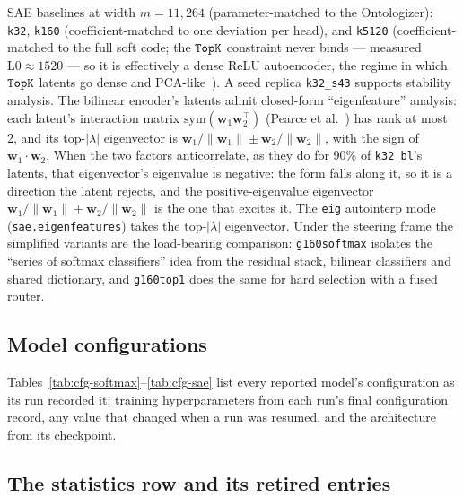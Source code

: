 SAE baselines at width $m{=}11{,}264$ (parameter-matched to the Ontologizer):
\texttt{k32}, \texttt{k160} (coefficient-matched to one deviation per
head), and \texttt{k5120} (coefficient-matched to the full soft code; the
$\mathop{\mathtt{TopK}}\limits$ constraint never binds --- measured $\mathrm{L0} \approx 1520$ --- so it is
effectively a dense ReLU autoencoder, the regime in which $\mathop{\mathtt{TopK}}\limits$ latents go
dense and PCA-like~\cite{gao2024}). A seed replica \texttt{k32\_s43}
supports stability analysis. The bilinear encoder's latents admit
closed-form ``eigenfeature'' analysis: each latent's interaction matrix
$\mathrm{sym}(\mathbf{w}_1 \mathbf{w}_2^\top)$ (Pearce
et al.~\cite{pearce2025}) has rank at most 2, and its top-$|\lambda|$
eigenvector is $\mathbf{w}_1/\lVert\mathbf{w}_1\rVert \pm
\mathbf{w}_2/\lVert\mathbf{w}_2\rVert$, with the sign of
$\mathbf{w}_1\cdot\mathbf{w}_2$. When the two factors anticorrelate, as
they do for 90\% of \texttt{k32\_bl}'s latents, that eigenvector's
eigenvalue is negative: the form falls along it, so it is a direction the
latent rejects, and the positive-eigenvalue eigenvector
$\mathbf{w}_1/\lVert\mathbf{w}_1\rVert + \mathbf{w}_2/\lVert\mathbf{w}_2\rVert$
is the one that excites it. The \texttt{eig} autointerp mode
(\texttt{sae.eigenfeatures}) takes the top-$|\lambda|$ eigenvector. Under the
steering frame the simplified variants are the load-bearing comparison:
\texttt{g160softmax} isolates the ``series of softmax classifiers'' idea
from the residual stack, bilinear classifiers and shared dictionary, and
\texttt{g160top1} does the same for hard selection with a fused router.

\subsection{Model configurations}
\label{app:configs}

Tables~\ref{tab:cfg-softmax}--\ref{tab:cfg-sae} list every reported
model's configuration as its run recorded it: training hyperparameters
from each run's final configuration record, any value that changed when
a run was resumed, and the architecture from its checkpoint.







\subsection{The statistics row and its retired entries}
\label{app:stats}

